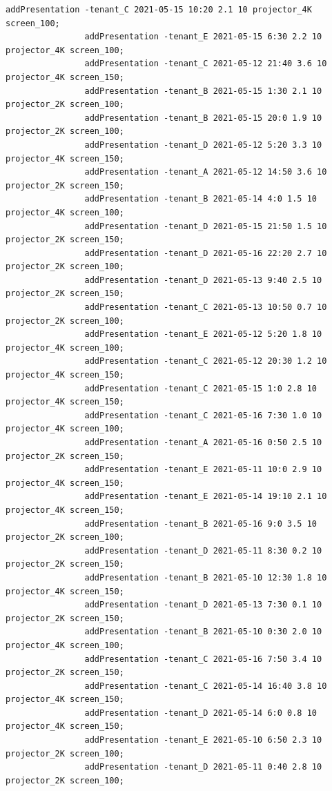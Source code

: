 \documentclass{article}
\begin{document}
\begin{Verbatim}[gobble=8]
                addPresentation -tenant_C 2021-05-15 10:20 2.1 10 projector_4K screen_100;
                addPresentation -tenant_E 2021-05-15 6:30 2.2 10 projector_4K screen_100;
                addPresentation -tenant_C 2021-05-12 21:40 3.6 10 projector_4K screen_150;
                addPresentation -tenant_B 2021-05-15 1:30 2.1 10 projector_2K screen_100;
                addPresentation -tenant_B 2021-05-15 20:0 1.9 10 projector_2K screen_100;
                addPresentation -tenant_D 2021-05-12 5:20 3.3 10 projector_4K screen_150;
                addPresentation -tenant_A 2021-05-12 14:50 3.6 10 projector_2K screen_150;
                addPresentation -tenant_B 2021-05-14 4:0 1.5 10 projector_4K screen_100;
                addPresentation -tenant_D 2021-05-15 21:50 1.5 10 projector_2K screen_150;
                addPresentation -tenant_D 2021-05-16 22:20 2.7 10 projector_2K screen_100;
                addPresentation -tenant_D 2021-05-13 9:40 2.5 10 projector_2K screen_150;
                addPresentation -tenant_C 2021-05-13 10:50 0.7 10 projector_2K screen_100;
                addPresentation -tenant_E 2021-05-12 5:20 1.8 10 projector_4K screen_100;
                addPresentation -tenant_C 2021-05-12 20:30 1.2 10 projector_4K screen_150;
                addPresentation -tenant_C 2021-05-15 1:0 2.8 10 projector_4K screen_150;
                addPresentation -tenant_C 2021-05-16 7:30 1.0 10 projector_4K screen_100;
                addPresentation -tenant_A 2021-05-16 0:50 2.5 10 projector_2K screen_150;
                addPresentation -tenant_E 2021-05-11 10:0 2.9 10 projector_4K screen_150;
                addPresentation -tenant_E 2021-05-14 19:10 2.1 10 projector_4K screen_150;
                addPresentation -tenant_B 2021-05-16 9:0 3.5 10 projector_2K screen_100;
                addPresentation -tenant_D 2021-05-11 8:30 0.2 10 projector_2K screen_150;
                addPresentation -tenant_B 2021-05-10 12:30 1.8 10 projector_4K screen_150;
                addPresentation -tenant_D 2021-05-13 7:30 0.1 10 projector_2K screen_150;
                addPresentation -tenant_B 2021-05-10 0:30 2.0 10 projector_4K screen_100;
                addPresentation -tenant_C 2021-05-16 7:50 3.4 10 projector_2K screen_150;
                addPresentation -tenant_C 2021-05-14 16:40 3.8 10 projector_4K screen_150;
                addPresentation -tenant_D 2021-05-14 6:0 0.8 10 projector_4K screen_150;
                addPresentation -tenant_E 2021-05-10 6:50 2.3 10 projector_2K screen_100;
                addPresentation -tenant_D 2021-05-11 0:40 2.8 10 projector_2K screen_100;

\end{Verbatim}
\end{document}
